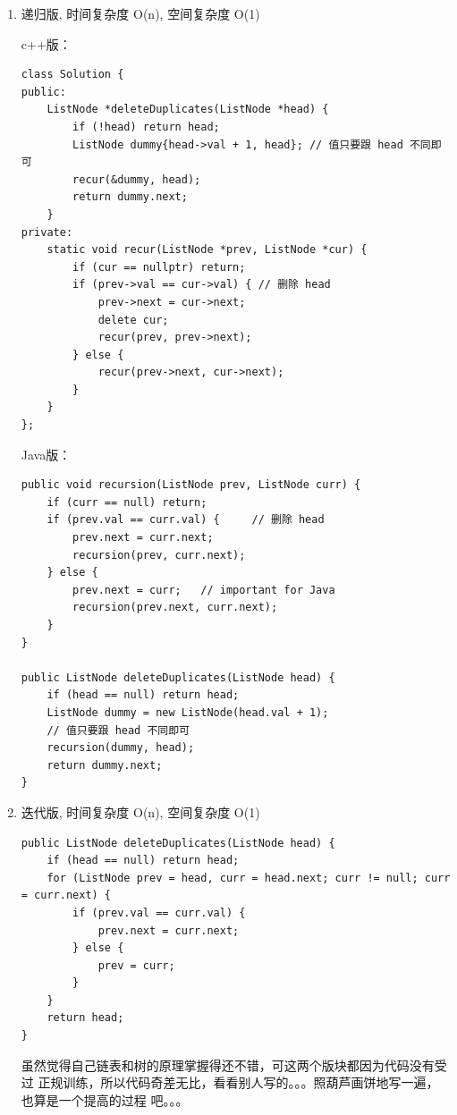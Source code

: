 \documentclass[12pt]{book}
\begin{document}
\begin{enumerate}
\item 递归版, 时间复杂度 O(n), 空间复杂度 O(1)
\label{sec-3-2-4-1}

c++版： 
\lstset{language=java,label= ,caption= ,numbers=none}
\begin{lstlisting}
class Solution {
public:
    ListNode *deleteDuplicates(ListNode *head) {
        if (!head) return head;
        ListNode dummy{head->val + 1, head}; // 值只要跟 head 不同即可
        recur(&dummy, head);
        return dummy.next;
    }
private:
    static void recur(ListNode *prev, ListNode *cur) {
        if (cur == nullptr) return;
        if (prev->val == cur->val) { // 删除 head
            prev->next = cur->next;
            delete cur;
            recur(prev, prev->next);
        } else {
            recur(prev->next, cur->next);
        }
    }
};
\end{lstlisting}

Java版：
\lstset{language=java,label= ,caption= ,numbers=none}
\begin{lstlisting}
public void recursion(ListNode prev, ListNode curr) {
    if (curr == null) return;
    if (prev.val == curr.val) {     // 删除 head
        prev.next = curr.next;
        recursion(prev, curr.next);
    } else {
        prev.next = curr;   // important for Java
        recursion(prev.next, curr.next);
    }
}

public ListNode deleteDuplicates(ListNode head) {
    if (head == null) return head;
    ListNode dummy = new ListNode(head.val + 1);
    // 值只要跟 head 不同即可
    recursion(dummy, head);
    return dummy.next;
}
\end{lstlisting}

\item 迭代版, 时间复杂度 O(n), 空间复杂度 O(1)
\label{sec-3-2-4-2}

\lstset{language=java,label= ,caption= ,numbers=none}
\begin{lstlisting}
public ListNode deleteDuplicates(ListNode head) {
    if (head == null) return head;
    for (ListNode prev = head, curr = head.next; curr != null; curr = curr.next) {
        if (prev.val == curr.val) {
            prev.next = curr.next;
        } else {
            prev = curr;
        }
    }
    return head;
}
\end{lstlisting}

虽然觉得自己链表和树的原理掌握得还不错，可这两个版块都因为代码没有受过
正规训练，所以代码奇差无比，看看别人写的。。。照葫芦画饼地写一遍，也算是一个提高的过程
吧。。。
\end{enumerate}
\end{document}
